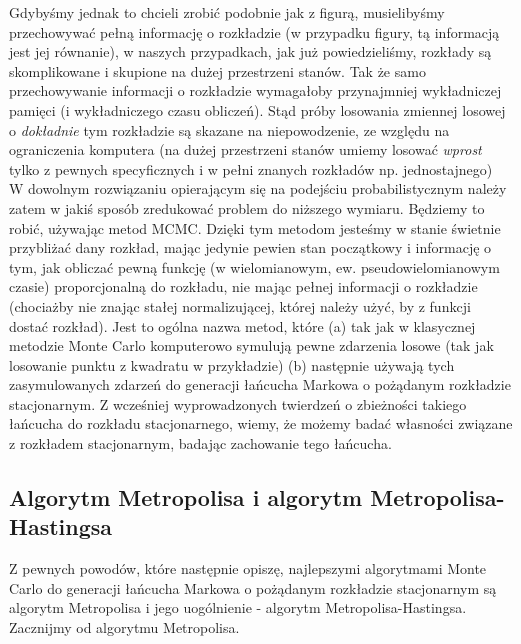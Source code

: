 \documentclass[a4paper]{article}
\theoremstyle{defn}
\theoremstyle{theorem}
\theoremstyle{lemma}
\theoremstyle{cor}
\theoremstyle{fact}
\begin{document}
Gdybyśmy jednak to chcieli zrobić podobnie jak z figurą, musielibyśmy przechowywać pełną informację o rozkładzie (w przypadku figury, tą informacją jest jej równanie), w naszych przypadkach, jak już powiedzieliśmy, rozkłady są skomplikowane i skupione na dużej przestrzeni stanów. Tak że samo przechowywanie informacji o rozkładzie  wymagałoby przynajmniej wykładniczej pamięci (i wykładniczego czasu obliczeń). Stąd próby losowania zmiennej losowej o \textit{dokładnie} tym rozkładzie są skazane na niepowodzenie, ze względu na ograniczenia komputera (na dużej przestrzeni stanów umiemy losować \textit{wprost} tylko z pewnych specyficznych i w pełni znanych rozkładów np. jednostajnego)\\
W dowolnym rozwiązaniu opierającym się na podejściu probabilistycznym należy zatem w jakiś sposób zredukować problem do niższego wymiaru. Będziemy to robić, używając metod MCMC. Dzięki tym metodom jesteśmy w stanie świetnie przybliżać dany rozkład, mając jedynie pewien stan początkowy i informację o tym, jak obliczać pewną funkcję (w wielomianowym, ew. pseudowielomianowym czasie) proporcjonalną do rozkładu, nie mając pełnej informacji o rozkładzie (chociażby nie znając stałej normalizującej, której należy użyć, by z funkcji dostać rozkład). Jest to ogólna nazwa metod, które (a) tak jak w klasycznej metodzie Monte Carlo komputerowo symulują pewne zdarzenia losowe (tak jak losowanie punktu z kwadratu w przykładzie) (b) następnie używają tych zasymulowanych zdarzeń do generacji łańcucha Markowa o pożądanym rozkładzie stacjonarnym. Z wcześniej wyprowadzonych twierdzeń o zbieżności takiego łańcucha do rozkładu stacjonarnego, wiemy, że możemy badać własności związane z rozkładem stacjonarnym, badając zachowanie tego łańcucha.


\subsection{Algorytm Metropolisa i algorytm Metropolisa-Hastingsa}
\label{sect3.2}
Z pewnych powodów, które następnie opiszę, najlepszymi algorytmami Monte Carlo do generacji łańcucha Markowa o pożądanym rozkładzie stacjonarnym są algorytm Metropolisa i jego uogólnienie - algorytm Metropolisa-Hastingsa. Zacznijmy od algorytmu Metropolisa.\\
\end{document}
